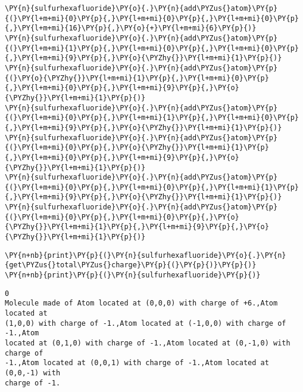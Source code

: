     \begin{tcolorbox}[breakable, size=fbox, boxrule=1pt, pad at break*=1mm,colback=cellbackground, colframe=cellborder]
\begin{Verbatim}[commandchars=\\\{\}]
\PY{n}{sulfurhexafluoride}\PY{o}{.}\PY{n}{add\PYZus{}atom}\PY{p}{(}\PY{l+m+mi}{0}\PY{p}{,}\PY{l+m+mi}{0}\PY{p}{,}\PY{l+m+mi}{0}\PY{p}{,}\PY{l+m+mi}{16}\PY{p}{,}\PY{o}{+}\PY{l+m+mi}{6}\PY{p}{)}
\PY{n}{sulfurhexafluoride}\PY{o}{.}\PY{n}{add\PYZus{}atom}\PY{p}{(}\PY{l+m+mi}{1}\PY{p}{,}\PY{l+m+mi}{0}\PY{p}{,}\PY{l+m+mi}{0}\PY{p}{,}\PY{l+m+mi}{9}\PY{p}{,}\PY{o}{\PYZhy{}}\PY{l+m+mi}{1}\PY{p}{)}
\PY{n}{sulfurhexafluoride}\PY{o}{.}\PY{n}{add\PYZus{}atom}\PY{p}{(}\PY{o}{\PYZhy{}}\PY{l+m+mi}{1}\PY{p}{,}\PY{l+m+mi}{0}\PY{p}{,}\PY{l+m+mi}{0}\PY{p}{,}\PY{l+m+mi}{9}\PY{p}{,}\PY{o}{\PYZhy{}}\PY{l+m+mi}{1}\PY{p}{)}
\PY{n}{sulfurhexafluoride}\PY{o}{.}\PY{n}{add\PYZus{}atom}\PY{p}{(}\PY{l+m+mi}{0}\PY{p}{,}\PY{l+m+mi}{1}\PY{p}{,}\PY{l+m+mi}{0}\PY{p}{,}\PY{l+m+mi}{9}\PY{p}{,}\PY{o}{\PYZhy{}}\PY{l+m+mi}{1}\PY{p}{)}
\PY{n}{sulfurhexafluoride}\PY{o}{.}\PY{n}{add\PYZus{}atom}\PY{p}{(}\PY{l+m+mi}{0}\PY{p}{,}\PY{o}{\PYZhy{}}\PY{l+m+mi}{1}\PY{p}{,}\PY{l+m+mi}{0}\PY{p}{,}\PY{l+m+mi}{9}\PY{p}{,}\PY{o}{\PYZhy{}}\PY{l+m+mi}{1}\PY{p}{)}
\PY{n}{sulfurhexafluoride}\PY{o}{.}\PY{n}{add\PYZus{}atom}\PY{p}{(}\PY{l+m+mi}{0}\PY{p}{,}\PY{l+m+mi}{0}\PY{p}{,}\PY{l+m+mi}{1}\PY{p}{,}\PY{l+m+mi}{9}\PY{p}{,}\PY{o}{\PYZhy{}}\PY{l+m+mi}{1}\PY{p}{)}
\PY{n}{sulfurhexafluoride}\PY{o}{.}\PY{n}{add\PYZus{}atom}\PY{p}{(}\PY{l+m+mi}{0}\PY{p}{,}\PY{l+m+mi}{0}\PY{p}{,}\PY{o}{\PYZhy{}}\PY{l+m+mi}{1}\PY{p}{,}\PY{l+m+mi}{9}\PY{p}{,}\PY{o}{\PYZhy{}}\PY{l+m+mi}{1}\PY{p}{)}
\end{Verbatim}
\end{tcolorbox}

    \begin{tcolorbox}[breakable, size=fbox, boxrule=1pt, pad at break*=1mm,colback=cellbackground, colframe=cellborder]
\begin{Verbatim}[commandchars=\\\{\}]
\PY{n+nb}{print}\PY{p}{(}\PY{n}{sulfurhexafluoride}\PY{o}{.}\PY{n}{get\PYZus{}total\PYZus{}charge}\PY{p}{(}\PY{p}{)}\PY{p}{)}
\PY{n+nb}{print}\PY{p}{(}\PY{n}{sulfurhexafluoride}\PY{p}{)}
\end{Verbatim}
\end{tcolorbox}

    \begin{Verbatim}[commandchars=\\\{\}]
0
Molecule made of Atom located at (0,0,0) with charge of +6.,Atom located at
(1,0,0) with charge of -1.,Atom located at (-1,0,0) with charge of -1.,Atom
located at (0,1,0) with charge of -1.,Atom located at (0,-1,0) with charge of
-1.,Atom located at (0,0,1) with charge of -1.,Atom located at (0,0,-1) with
charge of -1.
    \end{Verbatim}

